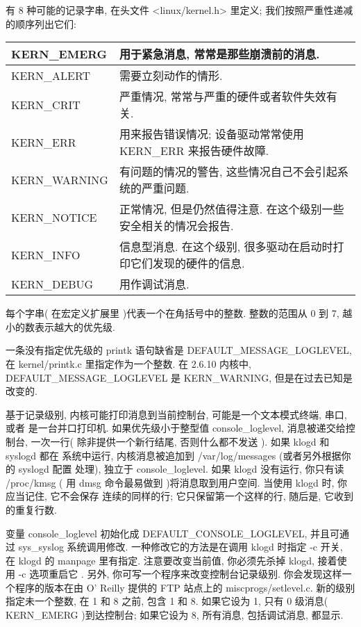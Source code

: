 \documentclass[a4paper,titlepage]{article}
\makeatletter
\newcommand{\tabcaption}{\def\@captype{table}\caption}
\makeatother
\begin{document}
有 8 种可能的记录字串, 在头文件 <linux/kernel.h> 里定义; 我们按照严重性递减的顺序列出它们:
\tabcaption{printk的优先级}
\begin{tabular}{|l|p{}|}\hline
KERN_EMERG & 用于紧急消息, 常常是那些崩溃前的消息.\\\hline
KERN_ALERT & 需要立刻动作的情形.\\\hline
KERN_CRIT & 严重情况, 常常与严重的硬件或者软件失效有关.\\\hline
KERN_ERR & 用来报告错误情况; 设备驱动常常使用 KERN_ERR 来报告硬件故障.\\\hline
KERN_WARNING & 有问题的情况的警告, 这些情况自己不会引起系统的严重问题.\\\hline
KERN_NOTICE & 正常情况, 但是仍然值得注意. 在这个级别一些安全相关的情况会报告.\\\hline
KERN_INFO & 信息型消息. 在这个级别, 很多驱动在启动时打印它们发现的硬件的信息.\\\hline 
KERN_DEBUG & 用作调试消息.\\\hline

\end{tabular}
每个字串( 在宏定义扩展里 )代表一个在角括号中的整数. 整数的范围从 0 到 7, 越小的数表示越大的优先级.

一条没有指定优先级的 printk 语句缺省是 DEFAULT_MESSAGE_LOGLEVEL, 在
kernel/printk.c 里指定作为一个整数. 在 2.6.10 内核中, DEFAULT_MESSAGE_LOGLEVEL
是 KERN_WARNING, 但是在过去已知是改变的.

基于记录级别, 内核可能打印消息到当前控制台, 可能是一个文本模式终端, 串口, 或者
是一台并口打印机. 如果优先级小于整型值 console_loglevel, 消息被递交给控制台,
一次一行( 除非提供一个新行结尾, 否则什么都不发送 ). 如果 klogd 和 syslogd 都在
系统中运行, 内核消息被追加到 /var/log/messages (或者另外根据你的 syslogd 配置
处理), 独立于 console_loglevel. 如果 klogd 没有运行, 你只有读 /proc/kmsg ( 用
dmsg 命令最易做到 )将消息取到用户空间. 当使用 klogd 时, 你应当记住, 它不会保存
连续的同样的行; 它只保留第一个这样的行, 随后是, 它收到的重复行数.

变量 console_loglevel 初始化成 DEFAULT_CONSOLE_LOGLEVEL, 并且可通过 sys_syslog
系统调用修改. 一种修改它的方法是在调用 klogd 时指定 -c 开关, 在 klogd 的
manpage 里有指定. 注意要改变当前值, 你必须先杀掉 klogd, 接着使用 -c 选项重启它
. 另外, 你可写一个程序来改变控制台记录级别. 你会发现这样一个程序的版本在由 O'
Reilly 提供的 FTP 站点上的 miscprogs/setlevel.c. 新的级别指定未一个整数, 在 1
和 8 之前, 包含 1 和 8. 如果它设为 1, 只有 0 级消息( KERN_EMERG )到达控制台;
如果它设为 8, 所有消息, 包括调试消息, 都显示.
\end{document}
